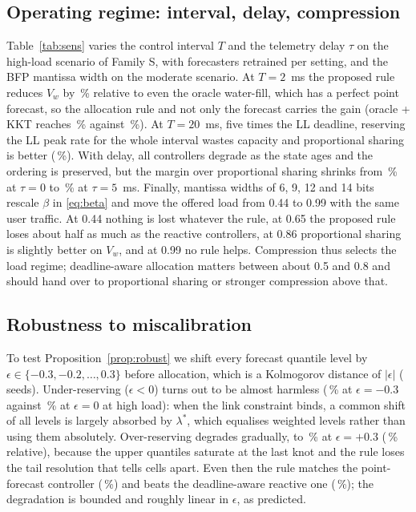 \documentclass[conference]{IEEEtran}
\begin{document}
\subsection{Operating regime: interval, delay, compression}
\label{sec:regime}
Table~\ref{tab:sens} varies the control interval $T$ and the telemetry delay $\tau$ on the high-load scenario of Family S, with forecasters retrained per setting, and the BFP mantissa width on the moderate scenario. At $T = 2$~ms the proposed rule reduces $V_w$ by \sweepTfouroracle{}\,\% relative to even the oracle water-fill, which has a perfect point forecast, so the allocation rule and not only the forecast carries the gain (oracle + KKT reaches \sweepTfouroraclekktAbs{}\,\% against \sweepTfouroracleAbs{}\,\%). At $T = 20$~ms, five times the LL deadline, reserving the LL peak rate for the whole interval wastes capacity and proportional sharing is better (\sweepTfourzeroreactiveprop{}\,\%). With delay, all controllers degrade as the state ages and the ordering is preserved, but the margin over proportional sharing shrinks from \delayTauzeroreactiveprop{}\,\% at $\tau = 0$ to \delayTauonezeroreactiveprop{}\,\% at $\tau = 5$~ms. Finally, mantissa widths of 6, 9, 12 and 14 bits rescale $\beta$ in \eqref{eq:beta} and move the offered load from 0.44 to 0.99 with the same user traffic. At 0.44 nothing is lost whatever the rule, at 0.65 the proposed rule loses about half as much as the reactive controllers, at 0.86 proportional sharing is slightly better on $V_w$, and at 0.99 no rule helps. Compression thus selects the load regime; deadline-aware allocation matters between about 0.5 and 0.8 and should hand over to proportional sharing or stronger compression above that.

\begin{table}[t]
\caption{Sensitivity on Family S: $V_w$ (\%, means over \nSeedsSweep{}/\nSeedsDelay{}/\nSeedsComp{}/\nSeedsWeights{} seeds)}
\label{tab:sens}
\centering
\scriptsize

\end{table}

\subsection{Robustness to miscalibration}
\label{sec:robust}
To test Proposition~\ref{prop:robust} we shift every forecast quantile level by $\epsilon \in \{-0.3, -0.2, \dots, 0.3\}$ before allocation, which is a Kolmogorov distance of $|\epsilon|$ (\nSeedsMisc{} seeds). Under-reserving ($\epsilon < 0$) turns out to be almost harmless (\mischighUnder{}\,\% at $\epsilon = -0.3$ against \mischighBase{}\,\% at $\epsilon = 0$ at high load): when the link constraint binds, a common shift of all levels is largely absorbed by $\lambda^\ast$, which equalises weighted levels rather than using them absolutely. Over-reserving degrades gradually, to \mischighWorst{}\,\% at $\epsilon = +0.3$ (\mischighWorstRel{}\,\% relative), because the upper quantiles saturate at the last knot and the rule loses the tail resolution that tells cells apart. Even then the rule matches the point-forecast controller (\mischighpointforecast{}\,\%) and beats the deadline-aware reactive one (\mischighqueueaware{}\,\%); the degradation is bounded and roughly linear in $\epsilon$, as predicted.
\end{document}
